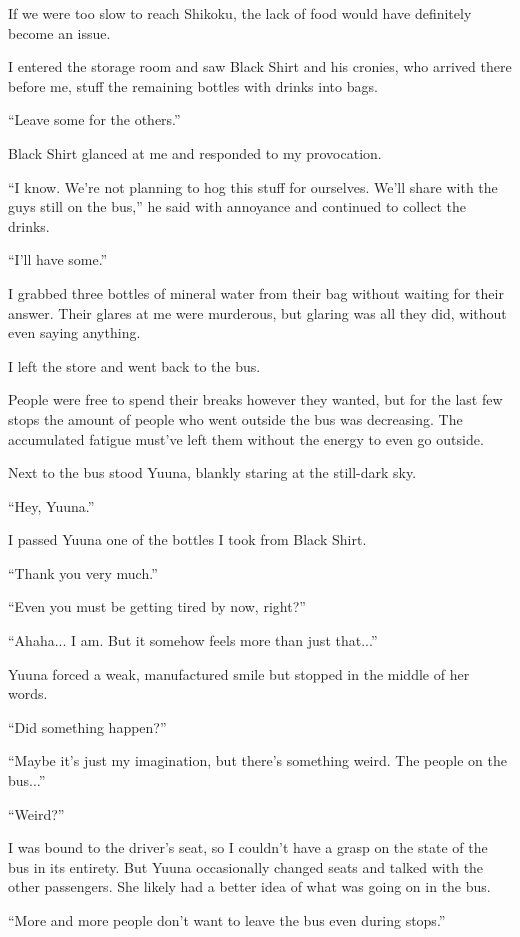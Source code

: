 If we were too slow to reach Shikoku, the lack of food would have definitely become an issue.

I entered the storage room and saw Black Shirt and his cronies, who arrived there before me, stuff the remaining bottles with drinks into bags.

``Leave some for the others.''

Black Shirt glanced at me and responded to my provocation.

``I know. We're not planning to hog this stuff for ourselves. We'll share with the guys still on the bus,'' he said with annoyance and continued to collect the drinks.

``I'll have some.''

I grabbed three bottles of mineral water from their bag without waiting for their answer. Their glares at me were murderous, but glaring was all they did, without even saying anything.

I left the store and went back to the bus.

People were free to spend their breaks however they wanted, but for the last few stops the amount of people who went outside the bus was decreasing. The accumulated fatigue must've left them without the energy to even go outside.

Next to the bus stood Yuuna, blankly staring at the still-dark sky.

``Hey, Yuuna.''

I passed Yuuna one of the bottles I took from Black Shirt.

``Thank you very much.''

``Even you must be getting tired by now, right?''

``Ahaha... I am. But it somehow feels more than just that...''

Yuuna forced a weak, manufactured smile but stopped in the middle of her words.

``Did something happen?''

``Maybe it's just my imagination, but there's something weird. The people on the bus...''

``Weird?''

I was bound to the driver's seat, so I couldn't have a grasp on the state of the bus in its entirety. But Yuuna occasionally changed seats and talked with the other passengers. She likely had a better idea of what was going on in the bus.

``More and more people don't want to leave the bus even during stops.''

